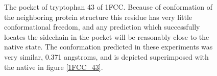 \begin{figure}
\begin{subfigure}[b]{0.3\textwidth}
        \caption{}
        \label{figure:mutation_side_chain_images/in_pocket_in_plane.png}
    \end{subfigure}
    \caption{The pocket of tryptophan 43 of 1FCC.  
Because of conformation of the neighboring protein structure this residue has very little conformational freedom, and any prediction which successfully locates the sidechain in the pocket will be reasonably close to the native state.
The conformation predicted in these experiments was very similar, 0.371 angstroms, and is depicted superimposed with the native in figure \protect\ref{1FCC_43}.}
    \label{figure:1fcc_43_pocket}
\end{figure}


